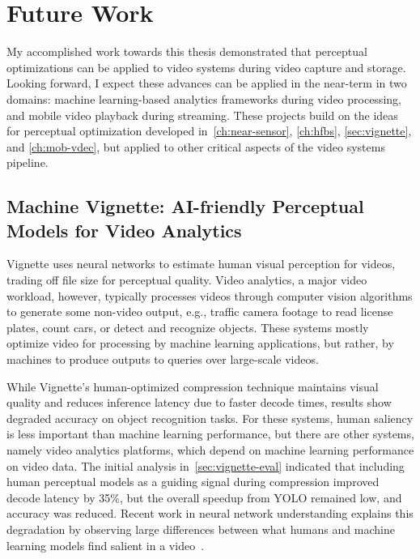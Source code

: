 \chapter{Future Work}
\label{ch:proposed}

My accomplished work towards this thesis demonstrated that perceptual optimizations can be applied to video systems during video capture and storage.
Looking forward, I expect these advances can be applied in the near-term in two domains: machine learning-based analytics frameworks during video processing, and mobile video playback during streaming.
These projects build on the ideas for perceptual optimization developed in~\ref{ch:near-sensor}, \ref{ch:hfbs}, \ref{sec:vignette}, and \ref{ch:mob-vdec}, but applied to other critical aspects of the video systems pipeline.



\section{Machine Vignette: AI-friendly Perceptual Models for Video Analytics}
\label{sec:mach-vign}
Vignette uses neural networks to estimate human visual perception for videos, trading off file size for perceptual quality.
Video analytics, a major video workload, however, typically processes videos through computer vision algorithms to generate some non-video output, e.g., traffic camera footage to read license plates, count cars, or detect and recognize objects.
These systems mostly optimize video for processing by machine learning applications, but rather, by machines to produce outputs to queries over large-scale videos.

While Vignette's human-optimized compression technique maintains visual quality and reduces inference latency due to faster decode times, results show degraded accuracy on object recognition tasks.
For these systems, human saliency is less important than machine learning performance, but there are other systems, namely video analytics platforms, which depend on machine learning performance on video data.
The initial analysis in~\ref{sec:vignette-eval} indicated that including human perceptual models as a guiding signal during compression improved decode latency by 35\%, but the overall speedup from YOLO remained low, and accuracy was reduced.
Recent work in neural network understanding explains this degradation by observing large differences between what humans and machine learning models find salient in a video~\cite{olah2018the}.

